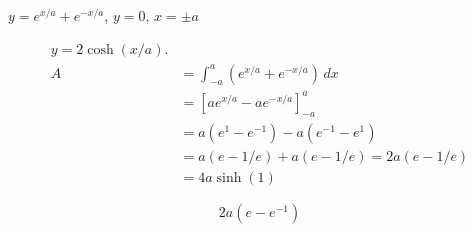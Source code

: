 $y=e^{x/a}+e^{-x/a}$, $y=0$, $x=\pm a$

\nopagebreak
\begin{align*}
y = 2\cosh(x/a). \\
A &= \int_{-a}^{a} (e^{x/a} + e^{-x/a}) \, dx \\
&= \left[ a e^{x/a} - a e^{-x/a} \right]_{-a}^{a} \\
&= a (e^1 - e^{-1}) - a (e^{-1} - e^1) \\
&= a(e - 1/e) + a(e - 1/e) = 2a(e - 1/e) \\
&= 4a \sinh(1)
\end{align*}

\[
\boxed{\displaystyle 2a(e - e^{-1})}
\]
